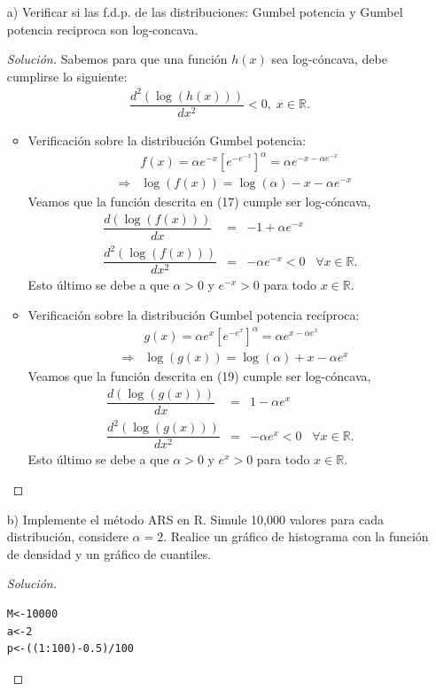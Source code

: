 \documentclass[11pt]{article}
\renewcommand{\=}[1]{\stackrel{#1}{=}} %
\newenvironment{sol}
{\begin{proof}[Solución]}
	{\end{proof}}
\theoremstyle{definition}
\theoremstyle{remark}
\begin{document}
\begin{itemize}
	\item[a)] Verificar si las f.d.p. de las distribuciones: Gumbel potencia y Gumbel potencia reciproca son log-concava.
	\begin{sol} Sabemos para que una función $h(x)$ sea log-cóncava, debe cumplirse lo siguiente:
		\begin{eqnarray}
		\dfrac{d^2(\log(h(x)))}{dx^2}<0,\;x\in\mathbb{R}.
		\end{eqnarray}
		\begin{itemize}
			\item Verificación sobre la distribución Gumbel potencia:
			\begin{eqnarray}
			&&f(x)=\alpha e^{-x}\left[e^{-e^{-x}}\right]^{\alpha} = \alpha e^{-x-\alpha e^{-x}}\nonumber\\
			&\Rightarrow& \log(f(x)) = \log(\alpha) -x-\alpha e^{-x}
			\end{eqnarray}
		Veamos que la función descrita en (17) cumple ser log-cóncava,
		\begin{eqnarray}
		\dfrac{d(\log(f(x)))}{dx} &=&-1+\alpha e^{-x}\nonumber\\
		\dfrac{d^2(\log(f(x)))}{dx^2} &=&-\alpha e^{-x} <0\;\;\;\forall x\in\mathbb{R}.
		\end{eqnarray}
		Esto último se debe a que $\alpha>0$ y $e^{-x}>0$ para todo $x\in\mathbb{R}$.
		\item Verificación sobre la distribución Gumbel potencia recíproca:
		\begin{eqnarray}
		&&g(x)=\alpha e^{x}\left[e^{-e^{x}}\right]^{\alpha} = \alpha e^{x-\alpha e^{x}}\nonumber\\
		&\Rightarrow& \log(g(x)) = \log(\alpha) +x-\alpha e^{x}
		\end{eqnarray}
		Veamos que la función descrita en (19) cumple ser log-cóncava,
		\begin{eqnarray}
		\dfrac{d(\log(g(x)))}{dx} &=&1-\alpha e^{x}\nonumber\\
		\dfrac{d^2(\log(g(x)))}{dx^2} &=&-\alpha e^{x} <0\;\;\;\forall x\in\mathbb{R}.
		\end{eqnarray}
		Esto último se debe a que $\alpha>0$ y $e^{x}>0$ para todo $x\in\mathbb{R}$.
		\end{itemize}
	\end{sol}
\newpage
\item[b)] Implemente el método ARS en R. Simule 10,000 valores para cada 
distribución, considere $\alpha=2$.
Realice un gráfico de histograma con la función de densidad y un gráfico de cuantiles.
\begin{sol}$ $
{
	\begin{lstlisting}[style=myRstyle, caption={Método ARS / Definiciones Iniciales.}]
M<-10000
a<-2
p<-((1:100)-0.5)/100
	\end{lstlisting}
}	


\end{sol}
\end{itemize}
\end{document}
